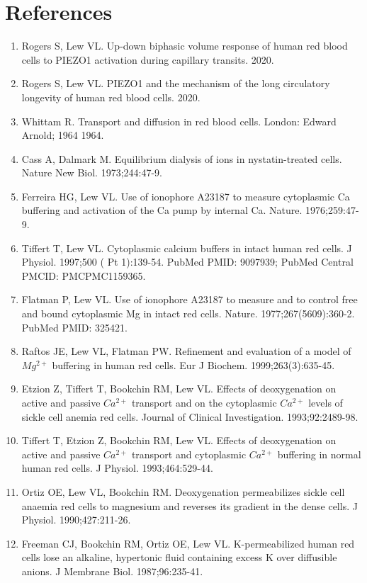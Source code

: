 \documentclass[a4paper]{article}
\begin{document}
\section{References}
\begin{enumerate}
\item Rogers S, Lew VL. Up-down biphasic volume response of human red blood cells to PIEZO1 activation during capillary transits. 2020.
\item Rogers S, Lew VL. PIEZO1 and the mechanism of the long circulatory longevity of human red blood cells. 2020.
\item Whittam R. Transport and diffusion in red blood cells. London: Edward Arnold; 1964 1964.
\item Cass A, Dalmark M. Equilibrium dialysis of ions in nystatin-treated cells. Nature New Biol. 1973;244:47-9.
\item Ferreira HG, Lew VL. Use of ionophore A23187 to measure cytoplasmic Ca buffering and activation of the Ca pump by internal Ca. Nature. 1976;259:47-9.
\item Tiffert T, Lew VL. Cytoplasmic calcium buffers in intact human red cells. J Physiol. 1997;500 ( Pt 1):139-54. PubMed PMID: 9097939; PubMed Central PMCID: PMCPMC1159365.
\item Flatman P, Lew VL. Use of ionophore A23187 to measure and to control free and bound cytoplasmic Mg in intact red cells. Nature. 1977;267(5609):360-2. PubMed PMID: 325421.
\item Raftos JE, Lew VL, Flatman PW. Refinement and evaluation of a model of $Mg^{2+}$ buffering in human red cells. Eur J Biochem. 1999;263(3):635-45.
\item Etzion Z, Tiffert T, Bookchin RM, Lew VL. Effects of deoxygenation on active and passive $Ca^{2+}$ transport and on the cytoplasmic $Ca^{2+}$ levels of sickle cell anemia red cells. Journal of Clinical Investigation. 1993;92:2489-98.
\item Tiffert T, Etzion Z, Bookchin RM, Lew VL. Effects of deoxygenation on active and passive $Ca^{2+}$ transport and cytoplasmic $Ca^{2+}$ buffering in normal human red cells. J Physiol. 1993;464:529-44.
\item Ortiz OE, Lew VL, Bookchin RM. Deoxygenation permeabilizes sickle cell anaemia red cells to magnesium and reverses its gradient in the dense cells. J Physiol. 1990;427:211-26.
\item Freeman CJ, Bookchin RM, Ortiz OE, Lew VL. K-permeabilized human red cells lose an alkaline, hypertonic fluid containing excess K over diffusible anions. J Membrane Biol. 1987;96:235-41.

\end{enumerate}
\end{document}

